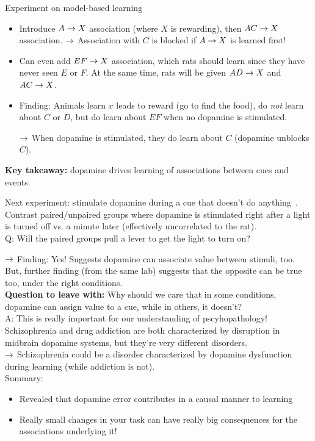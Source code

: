 Experiment on model-based learning~\cite{sharpe2017dopamine}
\begin{itemize}
    \item Introduce $A\rightarrow X$ association (where $X$ is rewarding), then $AC\rightarrow X$ association.
    $\rightarrow$ Association with $C$ is blocked if $A\rightarrow X$ is learned first!
    \item Can even add $EF \rightarrow X$ association, which rats should learn since they have never seen $E$ or $F$. At the same time, rats will be given $AD \rightarrow X$ and $AC \rightarrow X$. 
    
    \item Finding: Animals learn $x$ leads to reward (go to find the food), do {\it not} learn about $C$ or $D$, but do learn about $EF$ when no dopamine is stimulated.
    
    $\rightarrow$ When dopamine is stimulated, they do learn about $C$ (dopamine unblocks $C$).
\end{itemize}

{\bf Key takeaway:} dopamine drives learning of associations between cues and events.


Next experiment: stimulate dopamine during a cue that doesn't do anything~\cite{saunders2018dopamine}. Contrast paired/unpaired groups where dopamine is stimulated right after a light is turned off vs. a minute later (effectively uncorrelated to the rat). \\

Q: Will the paired groups pull a lever to get the light to turn on?

$\rightarrow$ Finding: Yes! Suggests dopamine can associate value between stimuli, too. But, further finding (from the same lab) suggests that the opposite can be true too, under the right conditions. \\

{\bf Question to leave with:} Why should we care that in some conditions, dopamine can assign value to a cue, while in others, it doesn't? \\

A: This is really important for our understanding of pscyhopathology! Schizophrenia and drug addiction are both characterized by disruption in midbrain dopamine systems, but they're very different disorders. \\

$\rightarrow$ Schizophrenia could be a disorder characterized by dopamine dysfunction during learning (while addiction is not). \\

Summary:
\begin{itemize}
    \item Revealed that dopamine error contributes in a causal manner to learning
    \item Really small changes in your task can have really big consequences for the associations underlying it!
\end{itemize}

